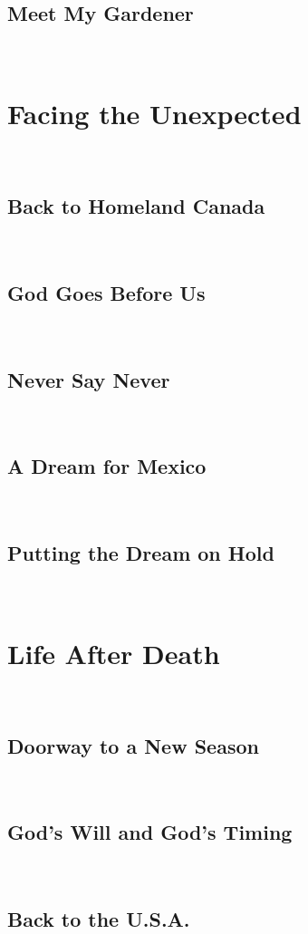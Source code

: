 \documentclass[oneside]{book}
\begin{document}
\section{Meet My Gardener}
\

\chapter{Facing the Unexpected}
\

\section{Back to Homeland Canada}
\

\section{God Goes Before Us}
\

\section{Never Say Never}
\

\section{A Dream for Mexico}
\

\section{Putting the Dream on Hold}
\

\chapter{Life After Death}
\

\section{Doorway to a New Season}
\

\section{God's Will and God's Timing}
\

\section{Back to the U.S.A.}
\
\end{document}
